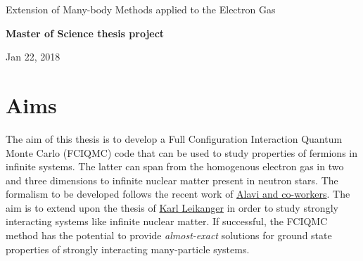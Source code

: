 \documentclass[%
oneside,                 %
final,                   %
10pt]{article}
\begin{document}

\newcommand{\exercisesection}[1]{\subsection*{#1}}






\thispagestyle{empty}

\begin{center}
{\LARGE\bf
\begin{spacing}{1.25}
Extension of Many-body Methods applied to the Electron Gas
\end{spacing}
}
\end{center}


\begin{center}
{\bf Master of Science thesis project${}^{}$} \\ [0mm]
\end{center}

\begin{center}
\end{center}
    

\begin{center}
Jan 22, 2018
\end{center}

\vspace{1cm}


\section*{Aims}

The aim of this thesis is to develop a Full Configuration Interaction Quantum Monte Carlo (FCIQMC)
code that can be used to study properties of fermions in infinite systems. The latter can span from 
the homogenous electron gas in two and three dimensions to infinite nuclear matter present in neutron stars. 
The formalism to be developed follows the recent work of \href{{http://www.nature.com/nature/journal/v493/n7432/full/nature11770.html}}{Alavi and co-workers}. The aim is to extend upon the thesis of \href{{https://www.duo.uio.no/handle/10852/37172}}{Karl Leikanger} in order to study strongly interacting systems like infinite nuclear matter.  If successful, the FCIQMC method has the potential to provide \emph{almost-exact} solutions for ground state properties of strongly interacting many-particle systems. 
\end{document}
